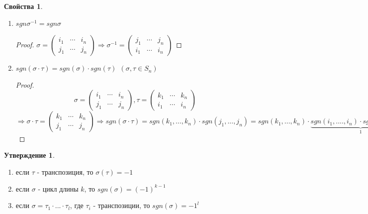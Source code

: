 \documentclass[a4paper, 12pt]{article}
\newcommand\tab[1][.5cm]{\hspace*{#1}}
\theoremstyle{definition}
\newtheorem*{subtheorem}{Утверждение}
\newtheorem*{properties}{Свойства}
\begin{document}
  \begin{properties} \tab 
    \begin{enumerate}
      \item $sgn \sigma^{-1} = sgn \sigma$
      \begin{proof}
        $\sigma = \begin{pmatrix}
          i_1 & \cdots & i_n \\
          j_1 & \cdots & j_n
        \end{pmatrix} \Longrightarrow \sigma^{-1} = \begin{pmatrix}
          j_1 & \cdots & j_n \\
          i_1 & \cdots & i_n  
        \end{pmatrix}$ 
      \end{proof}
      \item \label{propertie2} $sgn (\sigma \cdot \tau) = sgn(\sigma) \cdot sgn(\tau) \ \ (\sigma, \tau \in S_n)$ 
      \begin{proof}
        $$\sigma = \begin{pmatrix}
          i_1 & \cdots & i_n \\
          j_1 & \cdots & j_n
        \end{pmatrix}, 
        \tau = \begin{pmatrix}
        k_1 & \cdots & k_n \\
        i_1 & \cdots & i_n
        \end{pmatrix} $$ $ \Longrightarrow \sigma \cdot \tau = \begin{pmatrix}
          k_1 & \cdots & k_n \\
          j_1 & \cdots & j_n
        \end{pmatrix} \Longrightarrow sgn(\sigma \cdot \tau) = sgn(k_1,...,k_n) \cdot sgn(j_1,...,j_n) = sgn(k_1,...,k_n) \cdot \underbrace{sgn(i_1,....,i_n) \cdot sgn(i_1,....,i_n)}_{1}   \cdot sgn (j_1,...,j_n) = sgn(\sigma) \cdot sgn (\tau)$ 
      \end{proof} 
    \end{enumerate}
  \end{properties}
  \begin{subtheorem}\tab
    \begin{enumerate}
      \item \label{Ytv1} если $\tau$ - транспозиция, то $\sigma(\tau) = -1$
      \item если $\sigma$ - цикл длины $k$, то $sgn(\sigma) = (-1)^{k-1}$
      \item \label{Ytv3}если $\sigma = \tau_1 \cdot ... \cdot \tau_l$, где $\tau_i$ - транспозиции, то $sgn(\sigma) = -1^l$      
    \end{enumerate}
  \end{subtheorem}
\end{document}
